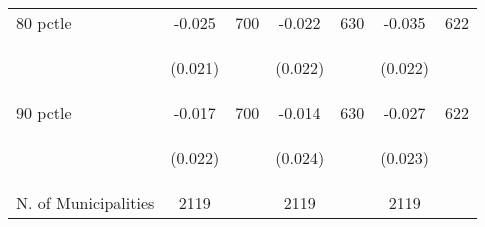 \begin{tabular}{lcccccc}
80 pctle   &  -0.025   &  700  &   -0.022  &  630 &  -0.035  &  622   \\

\vspace{4pt} &  \begin{footnotesize}(0.021)\end{footnotesize}   & &
			    \begin{footnotesize}(0.022)\end{footnotesize}   & &
			    \begin{footnotesize}(0.022)\end{footnotesize}   &
			     \\          

90 pctle   &  -0.017   &  700  &   -0.014  &  630 &  -0.027  &  622   \\

\vspace{4pt} &  \begin{footnotesize}(0.022)\end{footnotesize}   & &
			    \begin{footnotesize}(0.024)\end{footnotesize}   & &
			    \begin{footnotesize}(0.023)\end{footnotesize}   &
			     \\          


N. of Municipalities   &   2119   & &    2119 &    &  2119  &   \\
\hline	


\end{tabular}%
